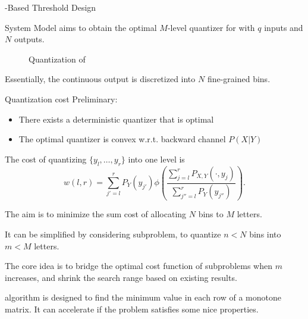 \documentclass[9pt]{beamer}
\begin{document}
	\begin{section}{-Based Threshold Design}
		\begin{frame}{System Model}
			\cite{He2021} aims to obtain the optimal $M$-level quantizer for  with $q$ inputs and $N$ outputs.
			\begin{figure}
				\caption{Quantization of  \cite{He2021}}
			\end{figure}
			Essentially, the continuous output is discretized into $N$ fine-grained bins.
		\end{frame}

		\begin{frame}{Quantization cost}
			Preliminary:
			\begin{itemize}
				\item There exists a deterministic quantizer that is optimal
				\item The optimal quantizer is convex w.r.t. backward channel $P(X|Y)$
			\end{itemize}

			\vspace{1em}
			The cost of quantizing $\{y_l,\ldots,y_r\}$ into one level is
			\begin{equation}
				w(l,r) = \sum_{j'=l}^r P_Y(y_{j'}) \phi \left(\frac{\sum_{j=l}^r P_{X,Y}(\cdot,y_j)}{\sum_{j''=l}^r P_Y(y_{j''})}\right).
			\end{equation}
		\end{frame}

		\begin{frame}{}
			The aim is to minimize the sum cost of allocating $N$ bins to $M$ letters.

			\vspace{1em}
			It can be simplified by considering subproblem, to quantize $n < N$ bins into $m < M$ letters.

			\vspace{1em}
			The core idea is to bridge the optimal cost function of subproblems when $m$ increases, and shrink the search range based on existing results.
		\end{frame}

		\begin{frame}{}
			 algorithm \cite{Aggarwal1986} is designed to find the minimum value in each row of a monotone matrix. It can accelerate  if the problem satisfies some nice properties.


\end{frame}
\end{section}
\end{document}
